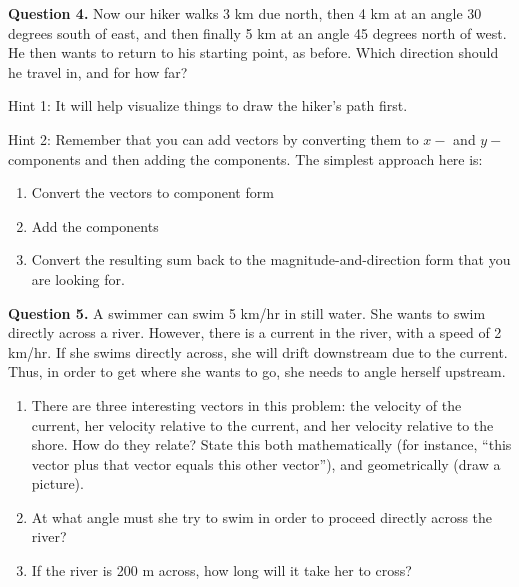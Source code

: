 \documentclass[12pt]{article}
\begin{document}
\newpage
{\bf Question 4.} Now our hiker walks 3 km due north, then 4 km at an angle 30 degrees south of east, and then finally 5 km at an angle 45 degrees north of west. He then wants to return to his starting point, as before. Which direction should he travel in, and for how far? 

Hint 1: It will help visualize things to draw the hiker's path first.

Hint 2: Remember that you can add vectors by converting them to $x-$ and $y-$components and then adding the components. The simplest approach here is:

\begin{enumerate}
	\item Convert the vectors to component form
	\item Add the components
	\item Convert the resulting sum back to the magnitude-and-direction form that you are looking for.
\end{enumerate}

\newpage
{\bf Question 5.} A swimmer can swim 5 km/hr in still water. She wants to swim directly across a river. However, there is a current in the river, with a speed of 2 km/hr. If she swims directly across, she will drift downstream due to the current. Thus, in order to get where she wants to go, she needs to angle herself upstream.

\begin{enumerate}
\item There are three interesting vectors in this problem: the velocity of the current, her velocity relative to the current, and her velocity relative to the shore. How do they relate? State this both mathematically (for instance, “this vector plus that vector equals this other vector”), and geometrically (draw a picture).
\vspace{3in}











\item At what angle must she try to swim in order to proceed directly across the river?





\vspace{1.5in}




\item If the river is 200 m across, how long will it take her to cross?

\end{enumerate}
\end{document}
